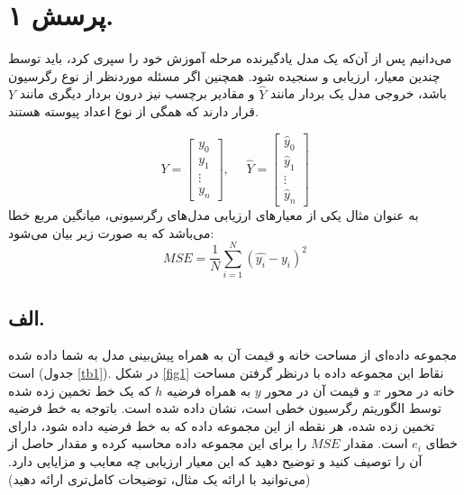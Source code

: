 \section[]{پرسش ۱.}
می‌دانیم پس از آن‌که یک مدل یادگیرنده مرحله آموزش خود را سپری کرد، باید توسط چندین معیار، ارزیابی و سنجیده شود. همچنین اگر مسئله موردنظر از نوع رگرسیون باشد، خروجی مدل یک بردار مانند $\hat{Y}$ و مقادیر برچسب نیز درون بردار دیگری مانند $Y$ قرار دارند که همگی از نوع اعداد پیوسته هستند. 

\begin{equation*}
	Y = \begin{bmatrix} y_{0} \\ y_{1} \\ \vdots \\ y_{n} \end{bmatrix},\:\:\:\:\:\: \hat{Y} = \begin{bmatrix} \hat{y}_{0} \\ \hat{y}_{1} \\ \vdots \\ \hat{y}_{n} \end{bmatrix}
\end{equation*}
به عنوان مثال یکی از معیارهای ارزیابی مدل‌های رگرسیونی، میانگین مربع خطا
می‌باشد که به صورت زیر بیان می‌شود:
\begin{equation}
	\label{eq1}
	MSE = \frac{1}{N} \sum_{i=1}^{N} (\hat{y_i} - y_i)^2
\end{equation}

\subsection*{الف.}
مجموعه داده‌ای از مساحت خانه و قیمت آن به همراه پیش‌بینی مدل به شما داده شده است (جدول \ref{tb1}). در شکل \ref{fig1} نقاط این مجموعه داده با درنظر گرفتن مساحت خانه در محور $x$ و قیمت آن در محور $y$ به همراه فرضیه $h$ که یک خط تخمین زده شده توسط الگوریتم رگرسیون خطی است، نشان داده شده است. باتوجه به خط فرضیه تخمین زده شده، هر نقطه از این مجموعه داده که به خط فرضیه داده شود، دارای خطای $e_i$ است. مقدار $MSE$ را برای این مجموعه داده محاسبه کرده و مقدار حاصل از آن را توصیف کنید و توضیح دهید که این معیار ارزیابی چه معایب و مزایایی دارد. (می‌توانید با ارائه یک مثال، توضیحات کامل‌تری ارائه دهید)
\\
\\ \\ \\ \\ \\ \\ 

